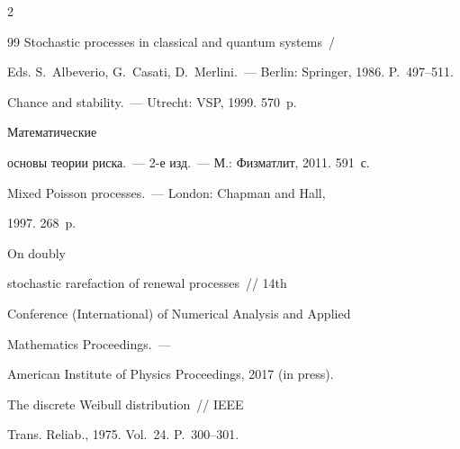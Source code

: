 \begin{multicols}{2}
{{\begin{thebibliography}{99}
    Stochastic processes in classical and quantum systems~/ 


    Eds. S.~Albeverio, G.~Casati, D.~Merlini.~--- Berlin: Springer, 1986. P.~497--511.


    






    Chance and stability.~--- Utrecht: VSP, 1999. 570~p.


    




 Математические


        основы теории риска.~--- 2-е изд.~--- М.: Физматлит, 2011. 591~с.


    




     Mixed Poisson processes.~--- London: Chapman and Hall,


    1997. 268~p.


    




 On doubly


    stochastic rarefaction of renewal processes~// 14th 


     Conference (International) of Numerical Analysis and Applied


    Mathematics Proceedings.~---


    American Institute of Physics Proceedings, 2017 (in press).


    




     The discrete Weibull distribution~// IEEE


    Trans. Reliab., 1975. Vol.~24. P.~300--301.


    







\end{thebibliography}}}
\end{multicols}

